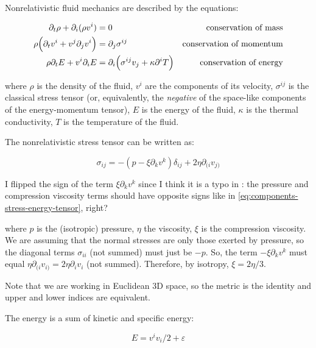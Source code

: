\documentclass[main.tex]{subfiles}
\begin{document}
Nonrelativistic fluid mechanics are described by the equations:

\begin{subequations}
\begin{align}
    \partial_t \rho + \partial_i (\rho v^i) &= 0 &\text{conservation of mass} \\
    \rho \qty(\partial_t v^i + v^j \partial_j v^i) &= \partial_j \sigma^{ij} &\text{conservation of momentum}  \\
    \rho \partial_t E + v^i \partial_i E &= \partial_i \qty(\sigma^{ij}v_j + \kappa\partial^i T) &\text{conservation of energy}
\end{align}
\end{subequations}

where $\rho$ is the density of the fluid,
$v^i$ are the components of its velocity,
$\sigma^{ij}$ is the classical stress tensor (or, equivalently, the \emph{negative} of the  space-like components of the energy-momentum tensor),
$E$ is the energy of the fluid,
$\kappa$ is the thermal conductivity,
$T$ is the temperature of the fluid.

The nonrelativistic stress tensor can be written as:

\begin{equation}
    \sigma_{ij} = -(p - \xi \partial_k v^k ) \delta_{ij} + 2 \eta \partial_{(i} v_{j)}
\end{equation}

\begin{greenbox}
  I flipped the sign of the term \(\xi \partial_k v^k\) since I think it is a typo in \cite[page 301]{Taub:1978}: the pressure and compression viscosity terms should have opposite signs like in \eqref{eq:components-stress-energy-tensor}, right?
\end{greenbox}

where $p$ is the (isotropic) pressure, $\eta$ the viscosity, $\xi$ is the compression viscosity. We are assuming that the normal stresses are only those exerted by pressure, so the diagonal terms $\sigma_{ii}$ (not summed) must just be $-p$. So, the term $-\xi \partial_k v^k$ must equal $\eta \partial_{(i} v_{i)} = 2\eta \partial_i v_i$ (not summed). Therefore, by isotropy, $\xi = 2\eta/3$.

Note that we are working in Euclidean 3D space, so the metric is the identity and upper and lower indices are equivalent.

The energy is a sum of kinetic and specific energy:

\begin{equation}
    E = v^i v_i /2 + \varepsilon
\end{equation}
\end{document}
